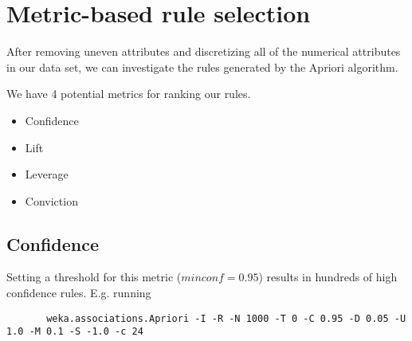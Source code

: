 \section{Metric-based rule selection}

After removing uneven attributes and discretizing all of the numerical attributes in our data set, we can investigate the rules generated by the Apriori algorithm. 

We have 4 potential metrics for ranking our rules.
\begin{itemize}
\item Confidence
\item Lift
\item Leverage
\item Conviction
\end{itemize}
%
\subsection{Confidence}
Setting a threshold for this metric ($minconf = 0.95$) results in hundreds of high confidence rules.
E.g. running 
\begin{verbatim}
	   weka.associations.Apriori -I -R -N 1000 -T 0 -C 0.95 -D 0.05 -U 1.0 -M 0.1 -S -1.0 -c 24
\end{verbatim}


